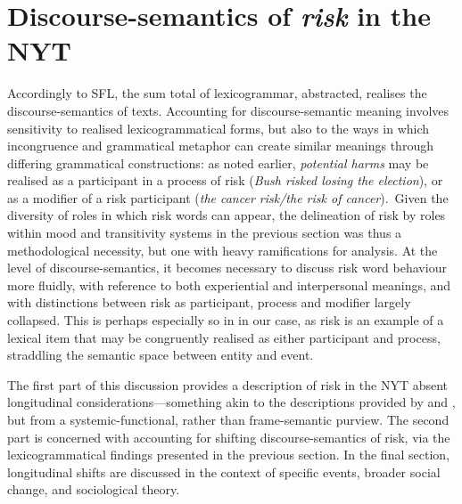 
\chapter{Discourse-semantics of \emph{risk} in the NYT}

	Accordingly to SFL, the sum total of lexicogrammar, abstracted, realises the discourse-semantics of texts. Accounting for discourse-semantic meaning involves sensitivity to realised lexicogrammatical forms, but also to the ways in which incongruence and grammatical metaphor can create similar meanings through differing grammatical constructions: as noted earlier, \emph{potential harms} may be realised as a participant in a process of risk (\emph{Bush risked losing the election}), or as a modifier of a risk participant (\emph{the cancer risk\slash the risk of cancer}).~Given the diversity of roles in which risk words can appear, the delineation of risk by roles within mood and transitivity systems in the previous section was thus a methodological necessity, but one with heavy ramifications for analysis. At the level of discourse-semantics, it becomes necessary to discuss risk word behaviour more fluidly, with reference to both experiential and interpersonal meanings, and with distinctions between risk as participant, process and modifier largely collapsed. This is perhaps especially so in in our case, as risk is an example of a lexical item that may be congruently realised as either participant and process, straddling the semantic space between entity and event.

	The first part of this discussion provides a description of risk in the NYT absent longitudinal considerations---something akin to the descriptions provided by  and , but from a systemic-functional, rather than frame-semantic purview. The second part is concerned with accounting for shifting discourse-semantics of risk, via the lexicogrammatical findings presented in the previous section. In the final section, longitudinal shifts are discussed in the context of specific events, broader social change, and sociological theory.


